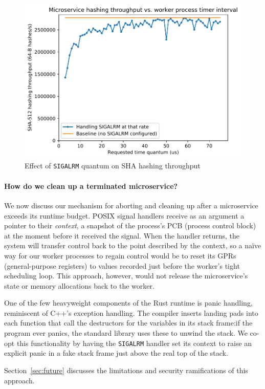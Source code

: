 \begin{figure}
\includegraphics[width=\columnwidth]{figs/2018-02-02-evaluation_quantum-hasher_throughput-throughput}
\caption{Effect of \texttt{SIGALRM} quantum on SHA hashing throughput}
\label{fig:hashtput}
\end{figure}

\paragraph{How do we clean up a terminated microservice?}
We now discuss our mechanism for aborting and cleaning up after a microservice
exceeds its runtime budget.  POSIX signal handlers receive as an argument a pointer to their
\textit{context}, a snapshot of the process's PCB (process control block) at the
moment before it received the signal.  When the handler returns, the system will
transfer control back to the point described by the context, so a naïve way for our
worker processes to regain control would be to reset its GPRs (general-purpose
registers) to values recorded just before the worker's tight scheduling loop.
This approach, however, would not release the microservice's state or memory
allocations back to the worker.

One of the few heavyweight components of the Rust runtime is panic handling,
reminiscent of C++'s exception handling.  The compiler inserts landing pads into each
function that call the destructors for the variables in its stack frame:\@ if the
program ever panics, the standard library uses these to unwind the stack.  We co-opt
this functionality by having the \texttt{SIGALRM} handler set its context to raise an
explicit panic in a fake stack frame just above the real top of the stack.

Section~\ref{sec:future} discusses the limitations and security ramifications of
this approach.
